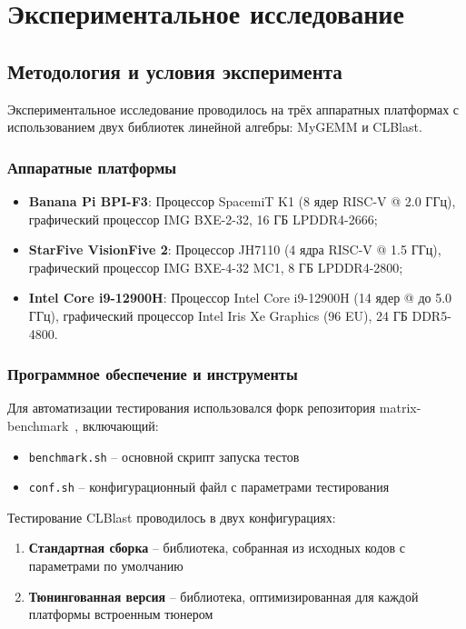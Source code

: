 
\section{Экспериментальное исследование}

\subsection{Методология и условия эксперимента}

Экспериментальное исследование проводилось на трёх аппаратных платформах с использованием двух библиотек линейной алгебры: MyGEMM и CLBlast.

\subsubsection{Аппаратные платформы}

\begin{itemize}
    \item \textbf{Banana Pi BPI-F3}: Процессор SpacemiT K1 (8 ядер RISC-V @ 2.0 ГГц), графический процессор IMG BXE-2-32, 16 ГБ LPDDR4-2666;
    \item \textbf{StarFive VisionFive 2}: Процессор JH7110 (4 ядра RISC-V @ 1.5 ГГц), графический процессор IMG BXE-4-32 MC1, 8 ГБ LPDDR4-2800;
    \item \textbf{Intel Core i9-12900H}: Процессор Intel Core i9-12900H (14 ядер @ до 5.0 ГГц), графический процессор Intel Iris Xe Graphics (96 EU), 24 ГБ DDR5-4800.
\end{itemize}

\subsubsection{Программное обеспечение и инструменты}

Для автоматизации тестирования использовался форк репозитория matrix-benchmark~\cite{matrix_benchmark_repo}, включающий:
\begin{itemize}
    \item \texttt{benchmark.sh} -- основной скрипт запуска тестов
    \item \texttt{conf.sh} -- конфигурационный файл с параметрами тестирования
\end{itemize}

Тестирование CLBlast проводилось в двух конфигурациях:
\begin{enumerate}
    \item \textbf{Стандартная сборка} -- библиотека, собранная из исходных кодов с параметрами по умолчанию
    \item \textbf{Тюнингованная версия} -- библиотека, оптимизированная для каждой платформы встроенным тюнером
\end{enumerate}

